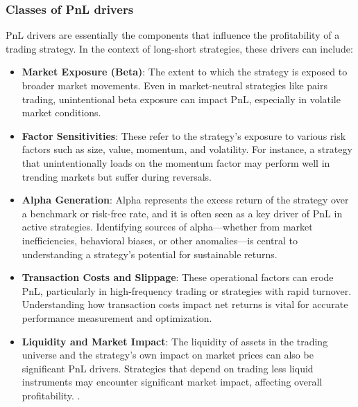 \subsubsection{Classes of PnL drivers}
\label{sec:classes-pnl-drivers}
PnL drivers are essentially the components that influence the profitability of a trading strategy. In the context of long-short strategies, these drivers can include:
\begin{itemize}
    \item \textbf{Market Exposure (Beta)}: The extent to which the strategy is exposed to broader market movements. Even in market-neutral strategies like pairs trading, unintentional beta exposure can impact PnL, especially in volatile market conditions. \cite{sharpe_1964}
    \item \textbf{Factor Sensitivities}: These refer to the strategy's exposure to various risk factors such as size, value, momentum, and volatility. For instance, a strategy that unintentionally loads on the momentum factor may perform well in trending markets but suffer during reversals. \cite{asness_moskowitz_lasse_pedersen_2013}
    \item \textbf{Alpha Generation}: Alpha represents the excess return of the strategy over a benchmark or risk-free rate, and it is often seen as a key driver of PnL in active strategies. Identifying sources of alpha—whether from market inefficiencies, behavioral biases, or other anomalies—is central to understanding a strategy's potential for sustainable returns. \cite{feibel_2003}
    \item \textbf{Transaction Costs and Slippage}: These operational factors can erode PnL, particularly in high-frequency trading or strategies with rapid turnover. Understanding how transaction costs impact net returns is vital for accurate performance measurement and optimization. \cite{gerhold_guasoni_muhle_2013}
    \item \textbf{Liquidity and Market Impact}: The liquidity of assets in the trading universe and the strategy's own impact on market prices can also be significant PnL drivers. Strategies that depend on trading less liquid instruments may encounter significant market impact, affecting overall profitability. \cite{tarun_chordia_roll_avanidhar_subrahmanyam_2001}.
\end{itemize}

